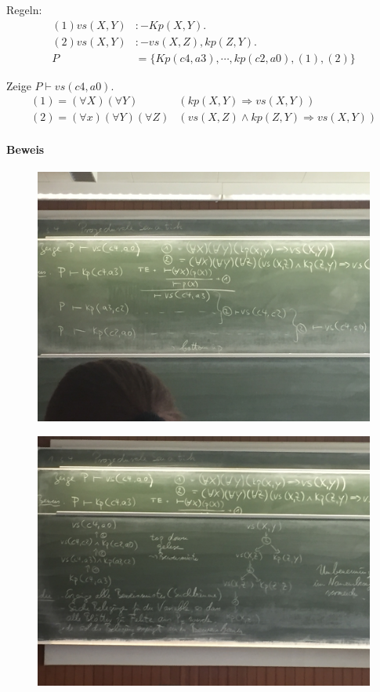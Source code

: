 \documentclass[12pt, a4paper]{article}
\begin{document}
Regeln: 
\begin{equation}
\begin{split}
(1) vs(X, Y) &:- Kp(X, Y). \\
(2) vs(X, Y) &:- vs(X, Z), kp(Z, Y). \\
P &= \{ Kp (c4, a3), \cdots, kp(c2, a0), (1), (2) \} 
\end{split}
\end{equation}

Zeige $P \vdash vs(c4, a0)$. 
\begin{equation}
\begin{split}
(1) = (\forall X)(\forall Y)&(kp(X, Y) \Rightarrow vs(X, Y)) \\
(2) = (\forall x)(\forall Y)(\forall Z)&(vs(X, Z) \wedge kp(Z , Y) \Rightarrow vs(X, Y))
\end{split}
\end{equation}

\paragraph{Beweis}
\begin{figure}
\centering
\includegraphics[width=0.7\linewidth]{img/img4}
\caption{}
\label{fig:img4}
\end{figure}
\begin{figure}
\centering
\includegraphics[width=0.7\linewidth]{img/img5}
\caption{}
\label{fig:img5}
\end{figure}
\end{document}

